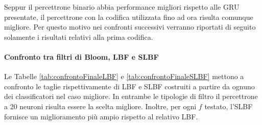 \documentclass[../../main.tex]{subfiles}
\begin{document}
    Seppur il percettrone binario abbia performance migliori rispetto alle GRU presentate, il percettrone con la codifica utilizzata fino ad ora risulta comunque migliore. Per questo motivo nei confronti successivi verranno riportati di seguito solamente i risultati relativi alla prima codifica.


    \paragraph{Confronto tra filtri di Bloom, LBF e SLBF}
    Le Tabelle \ref{tab:confrontoFinaleLBF} e \ref{tab:confrontoFinaleSLBF} mettono a confronto le taglie rispettivamente di LBF e SLBF costruiti a partire da ognuno dei classificatori nel caso migliore. In entrambe le tipologie di filtro il percettrone a 20 neuroni risulta essere la scelta migliore. Inoltre, per ogni $f$ testato, l'SLBF fornisce un miglioramento più ampio rispetto al relativo LBF.
\end{document}
